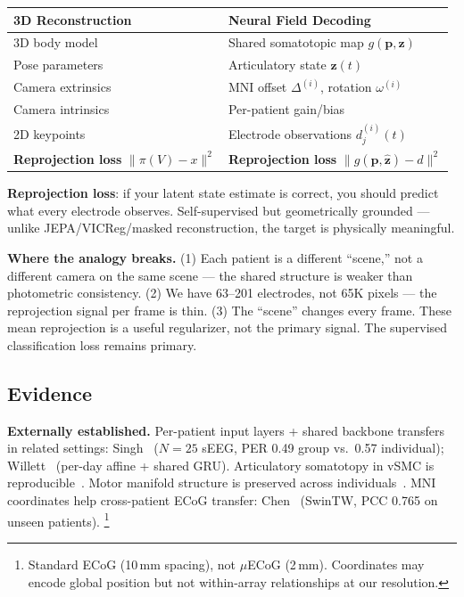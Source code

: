 \documentclass[11pt,letterpaper]{article}
\newcommand{\bfp}{\mathbf{p}}
\newcommand{\bfz}{\mathbf{z}}
\begin{document}
\begin{table}[ht!]\centering\small
\begin{tabular}{@{}ll@{}}
\toprule
\textbf{3D Reconstruction} & \textbf{Neural Field Decoding} \\
\midrule
3D body model & Shared somatotopic map $g(\bfp, \bfz)$ \\
Pose parameters & Articulatory state $\bfz(t)$ \\
Camera extrinsics & MNI offset $\Delta^{(i)}$, rotation $\omega^{(i)}$ \\
Camera intrinsics & Per-patient gain/bias \\
2D keypoints & Electrode observations $d_j^{(i)}(t)$ \\
\textbf{Reprojection loss} $\|\pi(V) - x\|^2$ & \textbf{Reprojection loss} $\|g(\bfp, \hat{\bfz}) - d\|^2$ \\
\bottomrule
\end{tabular}
\end{table}

\textbf{Reprojection loss}: if your latent state estimate is correct, you should predict what every electrode observes. Self-supervised but geometrically grounded --- unlike JEPA/VICReg/masked reconstruction, the target is physically meaningful.

\textbf{Where the analogy breaks.} (1) Each patient is a different ``scene,'' not a different camera on the same scene --- the shared structure is weaker than photometric consistency. (2) We have 63--201 electrodes, not 65K pixels --- the reprojection signal per frame is thin. (3) The ``scene'' changes every frame. These mean reprojection is a useful regularizer, not the primary signal. The supervised classification loss remains primary.

\subsection{Evidence}

\textbf{Externally established.}
Per-patient input layers + shared backbone transfers in related settings: Singh~\cite{singh2025} ($N{=}25$ sEEG, PER 0.49 group vs.\ 0.57 individual); Willett~\cite{willett2023} (per-day affine + shared GRU).
Articulatory somatotopy in vSMC is reproducible~\cite{metzger2023,bouchard2013}.
Motor manifold structure is preserved across individuals~\cite{safaie2023,gallego2020}.
MNI coordinates help cross-patient ECoG transfer: Chen~\cite{chen2025} (SwinTW, PCC 0.765 on unseen patients).%
\footnote{Standard ECoG (10\,mm spacing), not $\mu$ECoG (2\,mm). Coordinates may encode global position but not within-array relationships at our resolution.}
\end{document}

